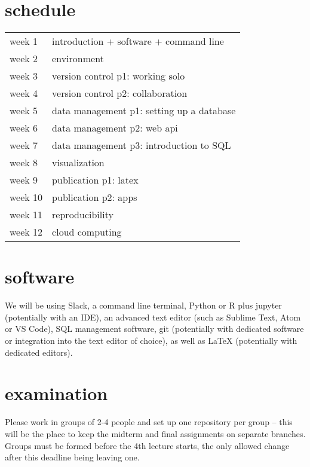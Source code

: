 \documentclass[12pt]{article}
\begin{document}

\section{schedule} %
\label{sec:schedule}

\begin{tabularx}{0.7\textwidth}{Xl}
    week 1 & introduction + software + command line \\
    week 2 & environment \\
    week 3 & version control p1: working solo \\
    week 4 & version control p2: collaboration \\
    week 5 & data management p1: setting up a database \\
    week 6 & data management p2: web api \\
    week 7 & data management p3: introduction to SQL \\
    week 8 & visualization \\
    week 9 & publication p1: latex \\
    week 10 & publication p2: apps \\
    week 11 & reproducibility \\
    week 12 & cloud computing
\end{tabularx}


\section{software} %
\label{sec:software}
We will be using Slack, a command line terminal, Python or R plus jupyter (potentially with an IDE), an advanced text editor (such as Sublime Text, Atom or VS Code), SQL management software, git (potentially with dedicated software or integration into the text editor of choice), as well as LaTeX (potentially with dedicated editors).


\newpage
\section{examination} %
\label{sec:examination}

Please work in groups of 2-4 people and set up one repository per group -- this will be the place to keep the midterm and final assignments on separate branches. Groups must be formed before the 4th lecture starts, the only allowed change after this deadline being leaving one.
\end{document}
